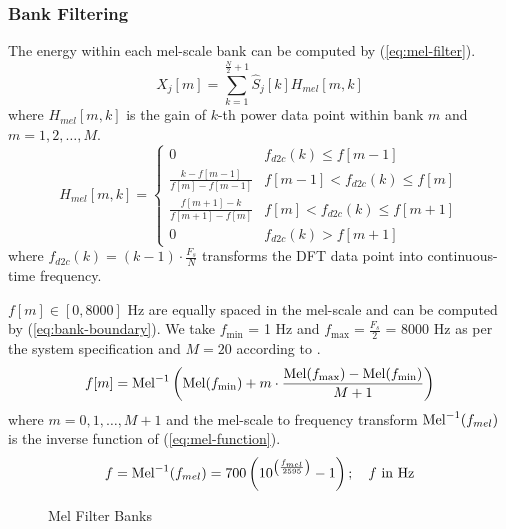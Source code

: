 
\subsubsection{Bank Filtering}

The energy within each mel-scale bank can be computed by (\ref{eq:mel-filter}).
\begin{equation}
\label{eq:mel-filter}
X_j[m] = \sum^{\frac{N}{2} + 1}_{k=1} \hat{S}_j[k] H_{mel}[m, k]
\end{equation}
where $H_{mel}[m, k]$ is the gain of $k$-th power data point within bank $m$ and $m = 1, 2, \dots, M$.\\

\begin{equation}
\label{eq:mel-bank-gain}
H_{mel}[m, k] =
\begin{cases}
0 &f_{d2c}(k) \le f[m-1]\\
\displaystyle\frac{k - f[m-1]}{f[m] - f[m-1]} &f[m-1] < f_{d2c}(k) \le f[m]\\
\displaystyle\frac{f[m+1] - k}{f[m+1] - f[m]} &f[m] < f_{d2c}(k) \le f[m+1]\\
0 &f_{d2c}(k) > f[m+1]
\end{cases}
\end{equation}
where $f_{d2c}(k) = (k-1) \cdot \frac{F_s}{N}$ transforms the DFT data point into continuous-time frequency.

$f[m] \in [0, 8000]$ Hz are equally spaced in the mel-scale and can be computed by (\ref{eq:bank-boundary}). We take $f_{\min}$ = 1 Hz and $f_{\max} = \frac{F_s}{2}$ = 8000 Hz as per the system specification and $M = 20$ according to \cite{davis1980comparison}.
\begin{equation}
\label{eq:bank-boundary}
f[m] = \operatorname{Mel}^{-1} \left( \operatorname{Mel}(f_{\min}) + m \cdot \frac{\operatorname{Mel}(f_{\max}) - \operatorname{Mel}(f_{\min})}{M + 1} \right)
\end{equation}
where $m = 0, 1, \dots, M+1$ and the mel-scale to frequency transform $\operatorname{Mel}^{-1}(f_{mel})$ is the inverse function of (\ref{eq:mel-function}).
\begin{equation}
\label{eq:mel-function-inverse}
f = \operatorname{Mel}^{-1}(f_{mel}) = 700 \left( 10^{\left(\frac{f_{mel}}{2595}\right)} - 1 \right); \quad f \text{ in Hz}
\end{equation}

\begin{figure}[H]
\centering
{}
\caption{Mel Filter Banks}
\label{mel_triangle}
\end{figure}

